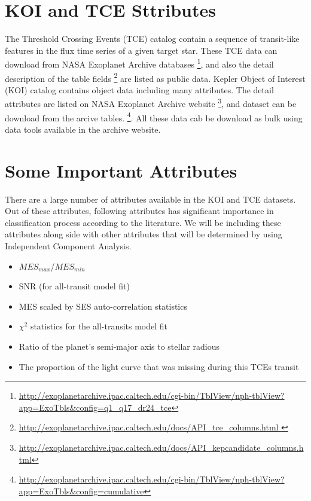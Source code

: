 \section{KOI and TCE Sttributes }

The Threshold Crossing Events (TCE) catalog contain a sequence of transit-like features in the flux time series of a given target star. These TCE data can download from NASA Exoplanet Archive databases \footnote{\url{http://exoplanetarchive.ipac.caltech.edu/cgi-bin/TblView/nph-tblView?app=ExoTbls&config=q1_q17_dr24_tce}}, and also the detail description of the table fields \footnote{\url{http://exoplanetarchive.ipac.caltech.edu/docs/API_tce_columns.html }} are listed as public data. Kepler Object of Interest (KOI) catalog contains object data including many attributes. The detail attributes are listed on NASA Exoplanet Archive website \footnote{\url{
http://exoplanetarchive.ipac.caltech.edu/docs/API_kepcandidate_columns.html}}, and dataset can be download from the arcive tables. \footnote{\url{http://exoplanetarchive.ipac.caltech.edu/cgi-bin/TblView/nph-tblView?app=ExoTbls&config=cumulative}}. All these data cab be download as bulk using data tools available in the archive website. 

\section{Some Important Attributes}

There are a large number of attributes available in the KOI and TCE datasets. Out of these attributes, following attributes has significant importance in classification process according to the literature. We will be including these attributes along side with other attributes that will be determined by using Independent Component Analysis.

\begin{itemize}
	\item $MES_{max}$/$MES_{min}$
	\item SNR (for all-transit model fit)
	\item MES scaled by SES auto-correlation statistics
	\item $\chi^{2}$ statistics for the all-transits model fit
	\item Ratio of the planet's semi-major axis to stellar radious
	\item The proportion of the light curve that was missing during this TCEs transit
\end{itemize}

